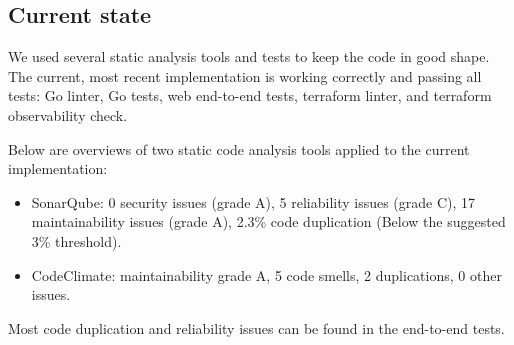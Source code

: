 

\subsection{Current state} %
We used several static analysis tools and tests to keep the
code in good shape. The current, most recent implementation
is working correctly and passing all tests: Go linter, Go 
tests, web end-to-end tests, terraform linter, and terraform 
observability check.

Below are overviews of two static code analysis tools applied to the 
current implementation:
\begin{itemize}
    \item SonarQube: 0 security issues (grade A), 5 reliability issues
    (grade C), 17 maintainability issues (grade A), 2.3\% code duplication
    (Below the suggested 3\% threshold).
    \item CodeClimate: maintainability grade A, 5 code smells, 2 duplications,
    0 other issues.
\end{itemize}

Most code duplication and reliability issues can be found in 
the end-to-end tests.

